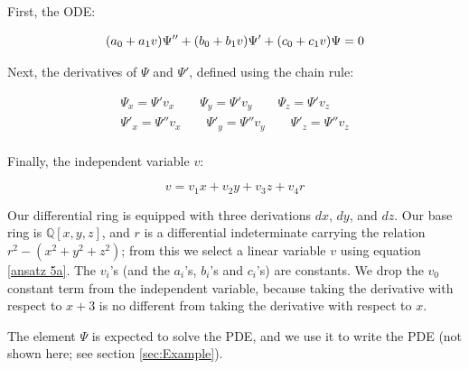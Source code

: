 \documentclass{article}
\theoremstyle{definition}
\theoremstyle{plain}
\begin{document}


First, the ODE:

\begin{equation}
\label{ansatz 5b}
(a_0 + a_1 v) \Psi'' + (b_0 + b_1 v) \Psi' + (c_0 + c_1 v) \Psi = 0 \\
\end{equation}

Next, the derivatives of $\Psi$ and $\Psi'$, defined using the chain rule:

\begin{equation}
\label{ansatz 5c}
\begin{gathered}
\Psi_x = \Psi' v_x \qquad
\Psi_y = \Psi' v_y \qquad
\Psi_z = \Psi' v_z \\
\Psi'_x = \Psi'' v_x \qquad
\Psi'_y = \Psi'' v_y \qquad
\Psi'_z = \Psi'' v_z \\
\end{gathered}
\end{equation}

Finally, the independent variable $v$:

\begin{equation}
\label{ansatz 5a}
v = v_1 x + v_2 y + v_3 z + v_4 r
\end{equation}

Our differential ring is equipped with three derivations $dx$, $dy$, and $dz$.
Our base ring
is $\mathbb{Q}[x,y,z]$, and $r$ is a differential indeterminate carrying the
relation $r^2 - (x^2 + y^2 + z^2)$;
from this we select a linear variable $v$ using equation
\eqref{ansatz 5a}.
The $v_i$'s (and the $a_i$'s, $b_i$'s and $c_i$'s) are constants.
We drop the $v_0$ constant term from the
independent variable, because taking
the derivative with respect to $x+3$ is no different from taking
the derivative with respect to $x$.

The element $\Psi$ is expected to solve the PDE, and we use it to write the PDE (not shown here; see section \ref{sec:Example}).
\end{document}
